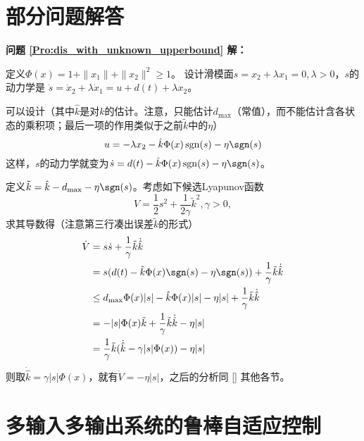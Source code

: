 \chapter{部分问题解答} \label{Problems}

\noindent\textcolor{winered}{\textbf{问题 \ref{Pro:dis_with_unknown_upperbound} 解：}}

定义$\Phi(x)=1 + \| x_1 \| + \| x_2 \|^2\ge 1$。
设计滑模面$s = x_2 + \lambda x_1 = 0,  \lambda > 0$，$s$的动力学是 $\dot{s} = \dot{x}_2 + \lambda \dot{x}_1 = u + d (t)
  + \lambda x_2$。

可以设计（其中$\hat{k}$是对$k$的估计。注意，只能估计$d_{\max}$（常值），而不能估计含各状态的乘积项；最后一项的作用类似于之前$\tilde{k}$中的$\eta$）
  \[ u = - \lambda x_2 - \hat{k}\Phi(x) \ensuremath{\operatorname{sgn}} (s) -\eta\sgn(s)\]
这样，$s$的动力学就变为$\dot{s}=d(t)-\hat{k}\Phi(x) \ensuremath{\operatorname{sgn}} (s)-\eta\sgn(s)$。

定义$\tilde{k}=\hat{k}-d_{\max}-\eta\sgn(s)$。考虑如下候选Lyapunov函数
  \[ V = \frac{1}{2} s^2 + \frac{1}{2 \gamma} \tilde{k}^2, \gamma > 0, \]
  求其导数得（注意第三行凑出误差$\tilde{k}$的形式）
  \begin{align*}
    \dot{V} & = s  \dot{s} + \frac{1}{\gamma} \tilde{k} \dot{\hat{k}}\\
    &=s(d(t)-\hat{k}\Phi(x)\sgn(s)-\eta\sgn(s))+\frac{1}{\gamma} \tilde{k} \dot{\hat{k}}\\
    & \leq d_{\max}\Phi(x)|s|-\hat{k}\Phi(x)|s|-\eta|s|+\frac{1}{\gamma} \tilde{k} \dot{\hat{k}}\\
    & = -|s|\Phi(x)\tilde{k}+\frac{1}{\gamma} \tilde{k} \dot{\hat{k}}-\eta|s|\\
    &= \frac{1}{\gamma}\tilde{k} (\dot{\hat{k}}-\gamma |s|\Phi(x))-\eta|s|
  \end{align*}
则取$\dot{\hat{k}}=\gamma |s|\Phi(x)$，就有$\dot{V}=-\eta|s|$，之后的分析同 \ref{} 其他各节。

\chapter{多输入多输出系统的鲁棒自适应控制} \label{MIMO_robust}

